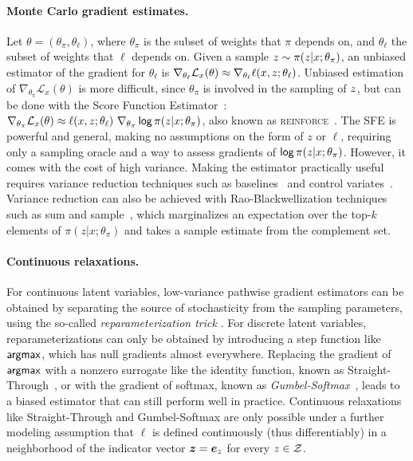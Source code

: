 \paragraph*{Monte Carlo gradient estimates.} Let $\theta=(\theta_\pi,
    \theta_\ell)$, where $\theta_\pi$ is the subset of weights that $\pi$
depends on, and $\theta_\ell$ the subset of weights that $\ell$
depends on. Given a sample $z \sim \pi(z| x;\theta_\pi)$, an
unbiased estimator of the gradient for  \wrt
$\theta_\ell$ is $\nabla_{\theta_\ell} \mathcal L_x(\theta) \approx
    \nabla_{\theta_\ell} \ell(x, z; \theta_\ell)$. Unbiased
estimation of $\nabla_{\theta_\pi} \mathcal L_x(\theta)$ is more
difficult, since $\theta_\pi$ is involved in the sampling of
$z$, but can be done with the Score Function
Estimator~\citep[SFE;][]{rubinstein1976monte,paisley2012variational}:
$\nabla_{\theta_\pi} \mathcal L_x(\theta) \approx \ell(x, z;
    \theta_\ell) ~ \nabla_{\theta_\pi} \operatorname*{\mathsf{log}} \pi(z | x; \theta_\pi)$,
also known as \textsc{reinforce}~\citep{Williams1992}. The SFE is
powerful and general, making no assumptions on the form of $z$ or
$\ell$, requiring only a sampling oracle and a way to assess
gradients of $\operatorname*{\mathsf{log}} \pi(z | x; \theta_\pi)$. However, it comes
with the cost of high variance. Making the estimator practically
useful requires variance reduction techniques such as
baselines~\citep{Williams1992,MuProp} and control
variates~\citep{CV2013,REBAR,RELAX}. Variance reduction can also be
achieved with Rao-Blackwellization techniques such as sum and
sample~\citep{casella1996rao,BBVI14,RB19}, which marginalizes an
expectation over the top-$k$ elements of $\pi(z| x;\theta_\pi)$ and
takes a sample estimate from the complement set.

\paragraph*{Continuous relaxations.} For continuous latent variables,
low-variance pathwise gradient estimators can be obtained by
separating the source of stochasticity from the sampling parameters,
using the so-called \emph{reparameterization trick}
\citep{Kingma+2014:VAE,RezendeEtAl14VAE}. For discrete latent
variables, reparameterizations can only be obtained by introducing a
step function like $\operatorname*{\mathsf{argmax}}$, which has null gradients almost everywhere.
Replacing the gradient of $\operatorname*{\mathsf{argmax}}$ with a nonzero surrogate like the identity
function, known as Straight-Through~\citep{STE}, or with the gradient of softmax, known
as \emph{Gumbel-Softmax}~\citep{Concrete,GumbelSoftmax}, leads to a
biased estimator that can still perform well in practice. Continuous
relaxations like Straight-Through and Gumbel-Softmax are only
possible under a further modeling assumption that $\ell$ is defined
continuously (thus differentiably) in a neighborhood of the
indicator vector $\bm{z} = \bm{e}_{z}$ for every $z \in \mathcal{Z}$.

